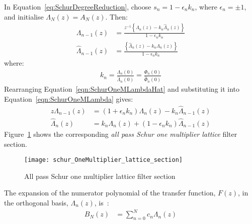 \documentclass[a4paper,twoside,10pt,english]{article}
\begin{document}
In Equation~\ref{eq:SchurDegreeReduction}, choose $s_{n}=1-\epsilon_{n}k_{n}$,
where $\epsilon_{n}=\pm 1$, and initialise $\Lambda_{N}\left(z\right)=A_{N}\left(z\right)$. Then:
\begin{subequations}
\begin{align}
  \Lambda_{n-1}\left(z\right) &= \frac{z^{-1}\left\{\Lambda_{n}\left(z\right)-
                             k_{n}\hat{\Lambda}_{n}\left(z\right)\right\}}
                                {1-\epsilon_{n}k_{n}}
  \label{eqn:SchurOneMLambda} \\
  \hat{\Lambda}_{n-1}\left(z\right)
                              &= \frac{\left\{\hat{\Lambda}_{n}\left(z\right)-
                                       k_{n}\Lambda_{n}\left(z\right)\right\}}
                                      {1-\epsilon_{n}k_{n}}
  \label{eqn:SchurOneMLambdaHat}
\end{align}
\end{subequations}
where:
\begin{align*}
  k_{n}=\frac{\Lambda_{n}\left(0\right)}{\hat{\Lambda}_{n}\left(0\right)}
  =\frac{\Phi_{n}\left(0\right)}{\hat{\Phi}_{n}\left(0\right)}
\end{align*}
Rearranging Equation~\ref{eqn:SchurOneMLambdaHat} and substituting it into
Equation~\ref{eqn:SchurOneMLambda} gives:
\begin{align*}
  z\Lambda_{n-1}\left(z\right)
  &=\left(1+\epsilon_{n}k_{n}\right)\Lambda_{n}\left(z\right)-
    k_{n}\hat{\Lambda}_{n-1}\left(z\right)\\
  \hat{\Lambda}_{n}\left(z\right) & = k_{n}\Lambda_{n}\left(z\right)+
              \left(1-\epsilon_{n}k_{n}\right)\hat{\Lambda}_{n-1}\left(z\right)
\end{align*}
Figure~\ref{fig:Schur-one-multiplier-lattice-section} shows the corresponding
\emph{all pass Schur one multiplier lattice} filter section.

\begin{figure}
\centering
\texttt{[image: schur\_OneMultiplier\_lattice\_section]}
\caption{All pass Schur one multiplier lattice filter section}
\label{fig:Schur-one-multiplier-lattice-section}
\end{figure}

The expansion of the numerator polynomial of the transfer function,
$F\left(z\right)$, in the orthogonal basis, $\Lambda_{n}\left(z\right)$,
is~\cite[Section 12.2.3]{Parhi_VLSIDigitalSignalProcessingSystems}:
\begin{align*}
B_{N}\left(z\right) & = \sum_{n=0}^{N}c_{n}\Lambda_{n}\left(z\right)
\end{align*}
\end{document}

